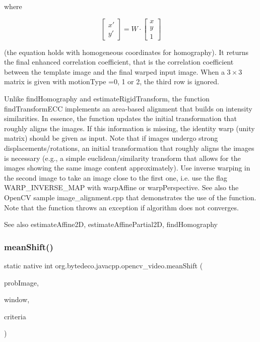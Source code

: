 where 

\[\begin{bmatrix} x' \\ y' \end{bmatrix} = W \cdot \begin{bmatrix} x \\ y \\ 1 \end{bmatrix}\] 

(the equation holds with homogeneous coordinates for homography). It returns the final enhanced correlation coefficient, that is the correlation coefficient between the template image and the final warped input image. When a $3\times 3$ matrix is given with motion\+Type =0, 1 or 2, the third row is ignored. 

Unlike find\+Homography and estimate\+Rigid\+Transform, the function find\+Transform\+E\+CC implements an area-\/based alignment that builds on intensity similarities. In essence, the function updates the initial transformation that roughly aligns the images. If this information is missing, the identity warp (unity matrix) should be given as input. Note that if images undergo strong displacements/rotations, an initial transformation that roughly aligns the images is necessary (e.\+g., a simple euclidean/similarity transform that allows for the images showing the same image content approximately). Use inverse warping in the second image to take an image close to the first one, i.\+e. use the flag W\+A\+R\+P\+\_\+\+I\+N\+V\+E\+R\+S\+E\+\_\+\+M\+AP with warp\+Affine or warp\+Perspective. See also the Open\+CV sample image\+\_\+alignment.\+cpp that demonstrates the use of the function. Note that the function throws an exception if algorithm does not converges. 

\begin{DoxySeeAlso}{See also}
estimate\+Affine2D, estimate\+Affine\+Partial2D, find\+Homography 
\end{DoxySeeAlso}
\mbox{\label{group__video__track_gad3336224aac304be4ee36ef146ec40d8}} 
\subsubsection{\texorpdfstring{mean\+Shift()}{meanShift()}}
{\footnotesize\ttfamily static native int org.\+bytedeco.\+javacpp.\+opencv\+\_\+video.\+mean\+Shift (\begin{DoxyParamCaption}\item[{@By\+Val Mat}]{prob\+Image,  }\item[{@By\+Ref Rect}]{window,  }\item[{@By\+Val Term\+Criteria}]{criteria }\end{DoxyParamCaption})\hspace{0.3cm}{\ttfamily [static]}}



